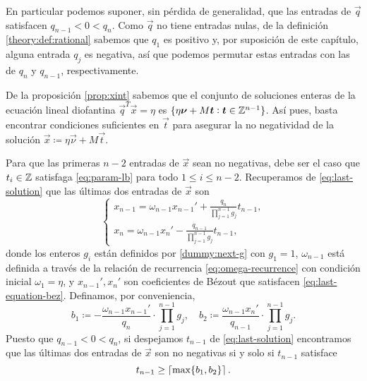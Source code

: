 En particular podemos suponer, sin pérdida de generalidad, que las entradas de  $\vec{q}$ satisfacen
$q_{n-1} < 0 < q_n$. Como $\vec{q}$ no tiene entradas nulas, de la
definición \ref{theory:def:rational} sabemos que $q_1$ es positivo y, por suposición de este capítulo,
alguna entrada $q_j$ es negativa, así que podemos permutar estas entradas con las de $q_n$ y
$q_{n-1}$, respectivamente.

De la proposición \ref{prop:xint} sabemos que el conjunto de soluciones enteras de la ecuación
lineal diofantina $\vec{q}^T\vec{x} = \eta$ es $\lbrace \eta\boldsymbol{\nu} + M\boldsymbol{t} \vcentcolon \boldsymbol{t}
\in \mathbb{Z}^{n-1} \rbrace$. Así pues, basta encontrar condiciones suficientes en $\vec{t}$ para asegurar la no
negatividad de la solución $\vec{x} \coloneq \eta\vec{\nu} + M\vec{t}$.

Para que las primeras $n - 2$ entradas de $\vec{x}$ sean no negativas, debe ser el caso que $t_i \in
\mathbb{Z}$ satisfaga \eqref{eq:param-lb} para todo $1 \leq i \leq n - 2$. Recuperamos de
\eqref{eq:last-solution} que las últimas dos entradas de $\vec{x}$ son
\begin{equation*}
	\begin{cases}
		x_{n-1} = \omega_{n-1}x_{n-1}' + \frac{q_n}{\prod_{j=1}^{n-1}g_j}t_{n-1}, \\
		x_n = \omega_{n-1}x_n' - \frac{q_{n-1}}{\prod_{j=1}^{n-1}g_j}t_{n-1},
	\end{cases}
\end{equation*}
donde los enteros $g_i$ están definidos por \eqref{dummy:next-g} con $g_1 = 1$, $\omega_{n-1}$ está
definida a través de la relación de recurrencia \eqref{eq:omega-recurrence} con condición inicial
$\omega_1 = \eta$, y $x_{n-1}', x_n'$ son coeficientes de Bézout que satisfacen
\eqref{eq:last-equation-bez}. Definamos, por conveniencia,
\begin{equation}
	\label{eq:lr-bounds}
	b_1 \coloneq -\frac{\omega_{n-1}x_{n-1}'}{q_n} \cdot \prod_{j=1}^{n-1}g_j, \quad
	b_2 \coloneq \frac{\omega_{n-1}x_{n}'}{q_{n-1}} \cdot \prod_{j=1}^{n-1}g_j.
\end{equation}
Puesto que $q_{n-1} < 0 < q_n$, si despejamos $t_{n-1}$ de \eqref{eq:last-solution} encontramos que
las últimas dos entradas de $\vec{x}$ son no negativas si y solo si $t_{n-1}$ satisface
\begin{equation}
	\label{eq:feasible-param:collapsed}
	t_{n-1} \geq \left\lceil \max\lbrace b_1, b_2 \rbrace \right\rceil.
\end{equation}


